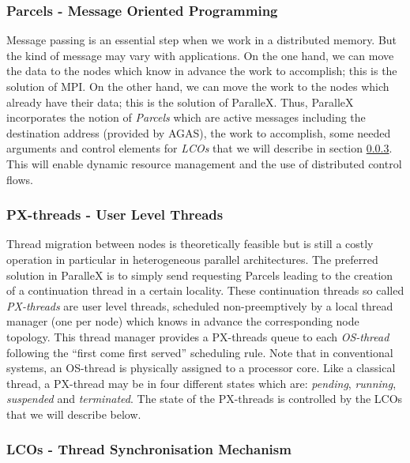 \documentclass{llncs}
\begin{document}
\subsubsection{Parcels - Message Oriented Programming}
Message passing is an essential step when we work in a distributed memory. But the kind of message may vary with applications. On the one hand, we can move the data to the nodes which know in advance the work to accomplish; this is the solution of MPI. On the other hand, we can move the work to the nodes which already have their data; this is the solution of ParalleX. Thus, ParalleX incorporates the notion of \emph{Parcels} \cite{ParalleX} which are active messages including the destination address (provided by AGAS), the work to accomplish, some needed arguments and control elements for \emph{LCOs} that we will describe in section \ref{lcos}. This will enable dynamic resource
management and the use of distributed control flows.

\subsubsection{PX-threads - User Level Threads}
Thread migration between nodes is theoretically feasible but is still a costly operation in particular in heterogeneous parallel architectures. The preferred solution in ParalleX is to simply send requesting Parcels leading to the creation of a continuation thread in a certain locality. These continuation threads so called \emph{PX-threads} \cite{ParalleX} are user level threads, scheduled non-preemptively by a local thread manager (one per node) which knows in advance the corresponding node topology. This thread manager provides a PX-threads queue to each \emph{OS-thread} \cite{ParalleX} following the \enquote{first come first served} scheduling rule. Note that in conventional systems, an OS-thread is physically assigned to a processor core. Like a classical thread, a PX-thread may be in four different states which are: \emph{pending}, \emph{running}, \emph{suspended} and \emph{terminated}. The state of the PX-threads is controlled by the LCOs that we will describe below.

\subsubsection{LCOs - Thread Synchronisation Mechanism}\label{lcos}
\end{document}
